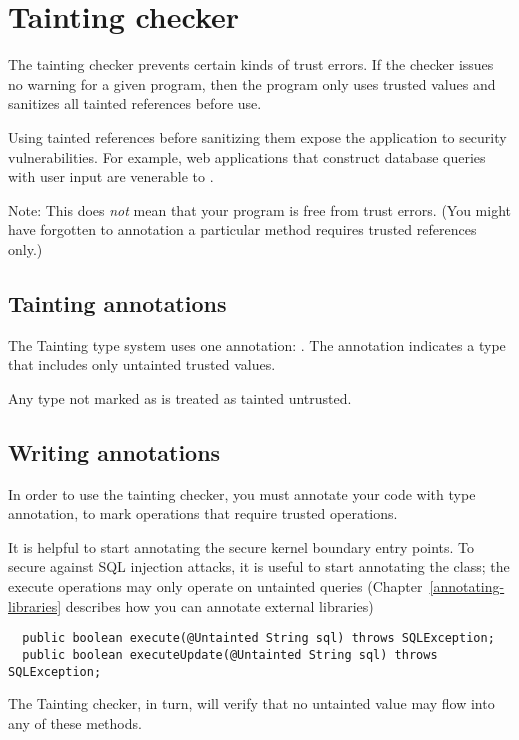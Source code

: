 \htmlhr
\chapter{Tainting checker\label{tainting-checker}}

The tainting checker prevents certain kinds of trust errors.  If the
checker issues no warning for a given program, then the program only
uses trusted values and sanitizes all tainted references before use.

Using tainted references before sanitizing them expose the application
to security vulnerabilities.  For example, web applications that construct
database queries with user input are venerable to
.

Note: This does \emph{not} mean that your program is free from trust errors.
(You might have forgotten to annotation a particular method requires trusted
references only.)

\section{Tainting annotations\label{tainting-annotations}}

The Tainting type system uses one annotation:
.  The annotation indicates
a type that includes only untainted trusted values.

Any type not marked as  is treated as tainted untrusted.

\section{Writing  annotations\label{writing-untainted}}

In order to use the tainting checker, you must annotate your code with
 type annotation, to mark
operations that require trusted operations.

It is helpful to start annotating the secure kernel boundary entry
points.  To secure against SQL injection attacks, it is useful to
start annotating the 
class; the execute operations may only operate on untainted queries
(Chapter~\ref{annotating-libraries} describes how you can annotate
external libraries)

\begin{Verbatim}
  public boolean execute(@Untainted String sql) throws SQLException;
  public boolean executeUpdate(@Untainted String sql) throws SQLException; 
\end{Verbatim}

The Tainting checker, in turn, will verify that no untainted value may flow into
any of these methods.

